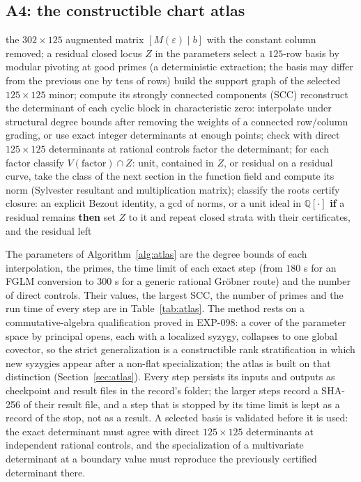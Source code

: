 \documentclass[11pt]{article}
\theoremstyle{remark}
\newcommand{\Q}{\mathbb{Q}}
\begin{document}
\subsection{A4: the constructible chart atlas}

\begin{algorithm}[t]
\caption{A4, one step of the constructible chart atlas (EXP-098, EXP-112 to EXP-131)}\label{alg:atlas}
\begin{algorithmic}[1]
\Require the $302\times125$ augmented matrix $[M(\varepsilon)\mid b]$ with the constant column removed; a residual closed locus $Z$ in the parameters
\State select a $125$-row basis by modular pivoting at good primes (a deterministic extraction; the basis may differ from the previous one by tens of rows)
\State build the support graph of the selected $125\times125$ minor; compute its strongly connected components (SCC)
\State reconstruct the determinant of each cyclic block in characteristic zero: interpolate under structural degree bounds after removing the weights of a connected row/column grading, or use exact integer determinants at enough points; check with direct $125\times125$ determinants at rational controls
\State factor the determinant; for each factor classify $V(\text{factor})\cap Z$: unit, contained in $Z$, or residual
\State on a residual curve, take the class of the next section in the function field and compute its norm (Sylvester resultant and multiplication matrix); classify the roots
\State certify closure: an explicit Bezout identity, a gcd of norms, or a unit ideal in $\Q[\cdot]$
\State \textbf{if} a residual remains \textbf{then} set $Z$ to it and repeat
\Ensure closed strata with their certificates, and the residual left
\end{algorithmic}
\end{algorithm}

The parameters of Algorithm~\ref{alg:atlas} are the degree bounds of each interpolation, the primes, the
time limit of each exact step (from $180$ s for an FGLM conversion to $300$ s for a
generic rational Gr\"obner route) and the number of direct controls. Their values, the largest SCC, the
number of primes and the run time of every step are in Table~\ref{tab:atlas}. The method rests on a
commutative-algebra qualification proved in EXP-098: a cover of the parameter space by principal opens, each with a localized
syzygy, collapses to one global covector, so the strict generalization is a constructible rank
stratification in which new syzygies appear after a non-flat specialization; the atlas is built on that
distinction (Section~\ref{sec:atlas}). Every step persists its inputs and outputs as checkpoint and result files in the record's
folder; the larger steps record a SHA-256 of their result file, and a step that is stopped by its time limit is kept as a record
of the stop, not as a result. A selected basis is validated before it is used: the exact determinant must agree with direct
$125\times125$ determinants at independent rational controls, and the specialization of a multivariate determinant at a boundary value must
reproduce the previously certified determinant there.
\end{document}
